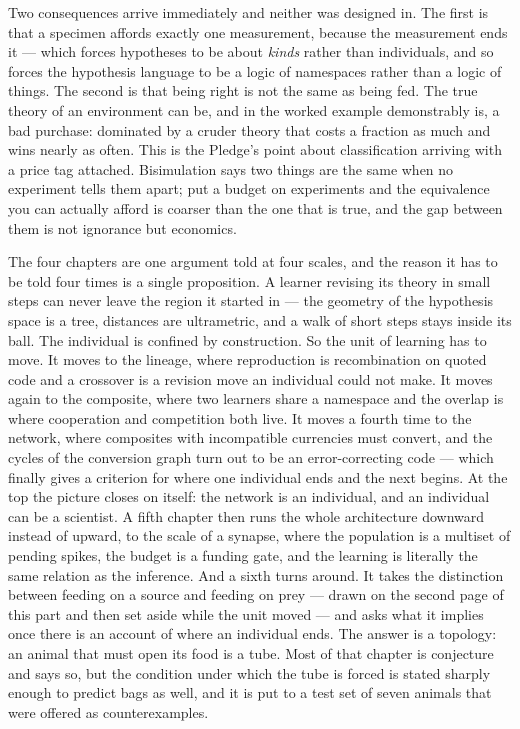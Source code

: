 \documentclass[12pt,openright,twoside]{book}
\theoremstyle{remark}
\theoremstyle{plain}
\theoremstyle{remark}
\theoremstyle{plain}
\theoremstyle{plain}
\begin{document}
Two consequences arrive immediately and neither was designed in.
The first is that a specimen affords exactly one measurement, because the
measurement ends it --- which forces hypotheses to be about \emph{kinds}
rather than individuals, and so forces the hypothesis language to be a
logic of namespaces rather than a logic of things.
The second is that being right is not the same as being fed.
The true theory of an environment can be, and in the worked example
demonstrably is, a bad purchase: dominated by a cruder theory that costs a
fraction as much and wins nearly as often.
This is the Pledge's point about classification arriving with a price tag
attached.
Bisimulation says two things are the same when no experiment tells them
apart; put a budget on experiments and the equivalence you can actually
afford is coarser than the one that is true, and the gap between them is
not ignorance but economics.

The four chapters are one argument told at four scales, and the reason it
has to be told four times is a single proposition.
A learner revising its theory in small steps can never leave the region it
started in --- the geometry of the hypothesis space is a tree, distances are
ultrametric, and a walk of short steps stays inside its ball.
The individual is confined by construction.
So the unit of learning has to move.
It moves to the lineage, where reproduction is recombination on quoted code
and a crossover is a revision move an individual could not make.
It moves again to the composite, where two learners share a namespace and
the overlap is where cooperation and competition both live.
It moves a fourth time to the network, where composites with incompatible
currencies must convert, and the cycles of the conversion graph turn out to
be an error-correcting code --- which finally gives a criterion for where one
individual ends and the next begins.
At the top the picture closes on itself: the network is an individual, and
an individual can be a scientist.
A fifth chapter then runs the whole architecture downward instead of
upward, to the scale of a synapse, where the population is a multiset of
pending spikes, the budget is a funding gate, and the learning is
literally the same relation as the inference.
And a sixth turns around. It takes the distinction between feeding on a
source and feeding on prey --- drawn on the second page of this part and
then set aside while the unit moved --- and asks what it implies once
there is an account of where an individual ends. The answer is a
topology: an animal that must open its food is a tube. Most of that
chapter is conjecture and says so, but the condition under which the
tube is forced is stated sharply enough to predict bags as well, and
it is put to a test set of seven animals that were offered as
counterexamples.
\end{document}
